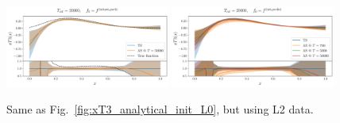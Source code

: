 \begin{figure}[ht!]
  \centering
  \includegraphics[width=0.48\textwidth]{plots/analytical_solution/pdf_plot_init_last_epoch_L2.pdf}
  \includegraphics[width=0.48\textwidth]{plots/analytical_solution/pdf_plot_init_epochs_L2.pdf}
  \caption{Same as Fig.~\ref{fig:xT3_analytical_init_L0}, but using L2 data.}
  \label{fig:xT3_analytical_init_L2}
\end{figure}



